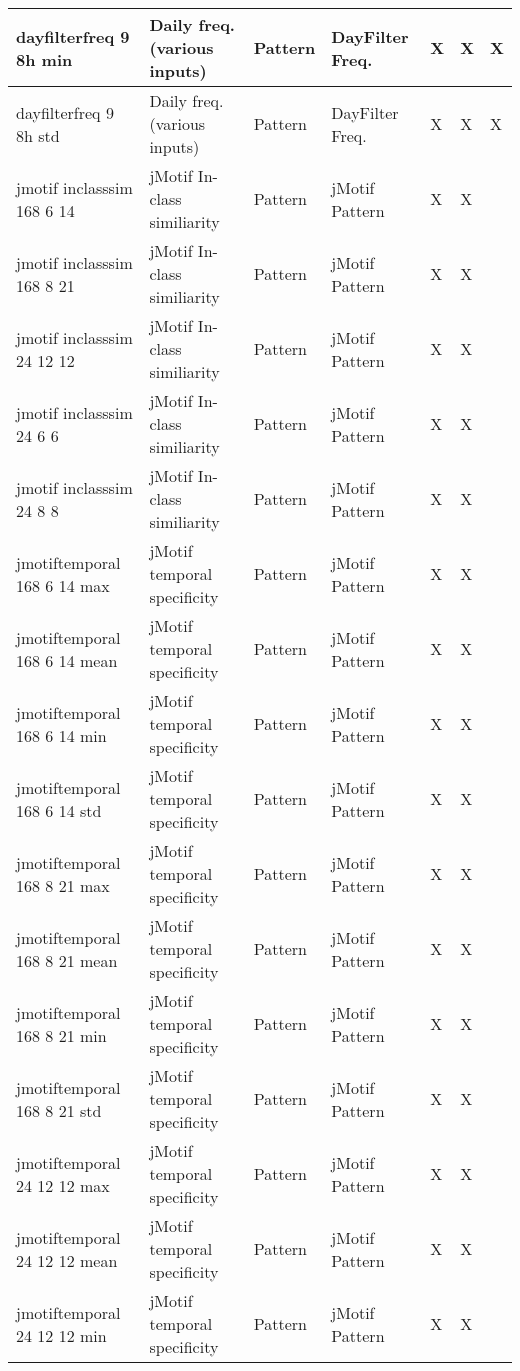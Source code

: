 {{\begin{longtable}[l]{ | p{4cm} | p{4cm} | p{1cm} | p{2cm} | p{0.3cm} | p{0.3cm} | p{0.3cm} |}
	 dayfilterfreq 9 8h min & Daily freq. (various inputs) & Pattern & DayFilter Freq. & X & X & X \\ \hline
	 dayfilterfreq 9 8h std & Daily freq. (various inputs) & Pattern & DayFilter Freq. & X & X & X \\ \hline
	 jmotif inclasssim 168 6 14 & jMotif In-class similiarity & Pattern & jMotif Pattern & X & X & \  \\ \hline
	 jmotif inclasssim 168 8 21 & jMotif In-class similiarity & Pattern & jMotif Pattern & X & X & \  \\ \hline
	 jmotif inclasssim 24 12 12 & jMotif In-class similiarity & Pattern & jMotif Pattern & X & X & \  \\ \hline
	 jmotif inclasssim 24 6 6 & jMotif In-class similiarity & Pattern & jMotif Pattern & X & X & \  \\ \hline
	 jmotif inclasssim 24 8 8 & jMotif In-class similiarity & Pattern & jMotif Pattern & X & X & \  \\ \hline
	 jmotiftemporal 168 6 14 max & jMotif temporal specificity  & Pattern & jMotif Pattern & X & X & \  \\ \hline
	 jmotiftemporal 168 6 14 mean & jMotif temporal specificity  & Pattern & jMotif Pattern & X & X & \  \\ \hline
	 jmotiftemporal 168 6 14 min & jMotif temporal specificity  & Pattern & jMotif Pattern & X & X & \  \\ \hline
	 jmotiftemporal 168 6 14 std & jMotif temporal specificity  & Pattern & jMotif Pattern & X & X & \  \\ \hline
	 jmotiftemporal 168 8 21 max & jMotif temporal specificity  & Pattern & jMotif Pattern & X & X & \  \\ \hline
	 jmotiftemporal 168 8 21 mean & jMotif temporal specificity  & Pattern & jMotif Pattern & X & X & \  \\ \hline
	 jmotiftemporal 168 8 21 min & jMotif temporal specificity  & Pattern & jMotif Pattern & X & X & \  \\ \hline
	 jmotiftemporal 168 8 21 std & jMotif temporal specificity  & Pattern & jMotif Pattern & X & X & \  \\ \hline
	 jmotiftemporal 24 12 12 max & jMotif temporal specificity  & Pattern & jMotif Pattern & X & X & \  \\ \hline
	 jmotiftemporal 24 12 12 mean & jMotif temporal specificity  & Pattern & jMotif Pattern & X & X & \  \\ \hline
	 jmotiftemporal 24 12 12 min & jMotif temporal specificity  & Pattern & jMotif Pattern & X & X & \  \\ \hline

\end{longtable}}}
